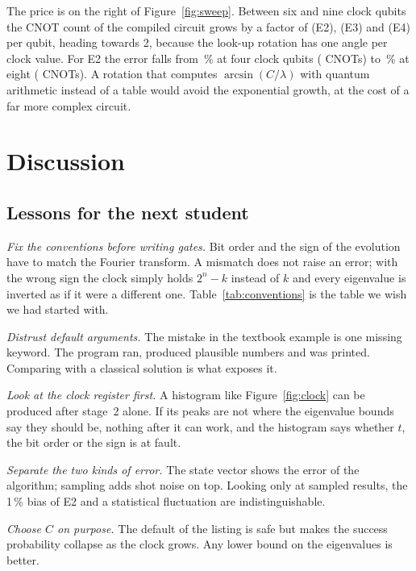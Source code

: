 \documentclass[manuscript,screen,review,nonacm]{acmart}
\begin{document}
The price is on the right of Figure~\ref{fig:sweep}. Between six and nine
clock qubits the CNOT count of the compiled circuit grows by a factor of
\ETwoCxGrowth{} (E2), \EThreeCxGrowth{} (E3) and \EFourCxGrowth{} (E4) per
qubit, heading towards 2, because the look-up rotation has one angle per clock
value. For E2 the error
falls from \ETwoRelErrFour\,\% at four clock qubits (\ETwoCxFour{} CNOTs) to
\ETwoRelErrEight\,\% at eight (\ETwoCxEight{} CNOTs). A rotation that computes
$\arcsin(C/\lambda)$ with quantum arithmetic instead of a table would avoid
the exponential growth, at the cost of a far more complex circuit.

\section{Discussion}
\label{sec:discussion}

\subsection{Lessons for the next student}

\emph{Fix the conventions before writing gates.} Bit order and the sign of
the evolution have to match the Fourier transform. A mismatch does not raise
an error; with the wrong sign the clock simply holds $2^n-k$ instead of $k$
and every eigenvalue is inverted as if it were a different one.
Table~\ref{tab:conventions} is the table we wish we had started with.

\emph{Distrust default arguments.} The mistake in the textbook example is one
missing keyword. The program ran, produced plausible numbers and was printed.
Comparing with a classical solution is what exposes it.

\emph{Look at the clock register first.} A histogram like
Figure~\ref{fig:clock} can be produced after stage~2 alone. If its peaks are
not where the eigenvalue bounds say they should be, nothing after it can work,
and the histogram says whether $t$, the bit order or the sign is at fault.

\emph{Separate the two kinds of error.} The state vector shows the error of
the algorithm; sampling adds shot noise on top. Looking only at sampled
results, the 1\,\% bias of E2 and a statistical fluctuation are
indistinguishable.

\emph{Choose $C$ on purpose.} The default of the listing is safe but makes the
success probability collapse as the clock grows. Any lower bound on the
eigenvalues is better.
\end{document}
